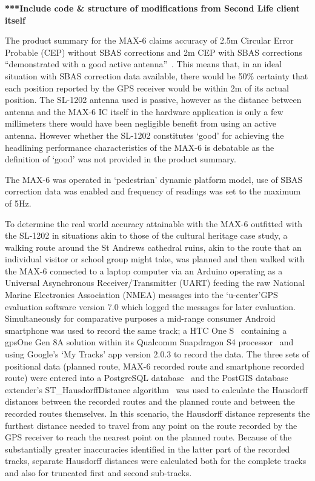\textbf{***Include code \& structure of modifications from Second Life client itself}



The product summary for the MAX-6 claims accuracy of 2.5m Circular Error Probable (CEP) without SBAS corrections and 2m CEP with SBAS corrections ``demonstrated with a good active antenna''~\cite{U-bloxAG2012}. This means that, in an ideal situation with SBAS correction data available, there would be 50\% certainty that each position reported by the GPS receiver would be within 2m of its actual position. The SL-1202 antenna used is passive, however as the distance between antenna and the MAX-6 IC itself in the hardware application is only a few millimeters there would have been negligible benefit from using an active antenna. However whether the SL-1202 constitutes `good' for achieving the headlining performance characteristics of the MAX-6 is debatable as the definition of `good' was not provided in the product summary.

The MAX-6 was operated in `pedestrian' dynamic platform model, use of SBAS correction data was enabled and frequency of readings was set to the maximum of 5Hz.

To determine the real world accuracy attainable with the MAX-6 outfitted with the SL-1202 in situations akin to those of the cultural heritage case study, a walking route around the St Andrews cathedral ruins, akin to the route that an individual visitor or school group might take, was planned and then walked with the MAX-6 connected to a laptop computer via an Arduino operating as a Universal Asynchronous Receiver/Transmitter (UART) feeding the raw National Marine Electronics Association (NMEA) messages into the `u-center'GPS evaluation software version 7.0 which logged the messages for later evaluation. Simultaneously for comparative purposes a mid-range consumer Android smartphone was used to record the same track; a HTC One S~\cite{HTCCorporation2013} containing a gpsOne Gen 8A solution within its Qualcomm Snapdragon S4 processor~\cite{QualcommIncorporated2013} and using Google's `My Tracks' app version 2.0.3 to record the data. The three sets of positional data (planned route, MAX-6 recorded route and smartphone recorded route) were entered into a PostgreSQL database~\cite{Daviesc,Daviesb} and the PostGIS database extender's ST\_HausdorffDistance algorithm~\cite{PostGIS} was used to calculate the Hausdorff distances between the recorded routes and the planned route and between the recorded routes themselves. In this scenario, the Hausdorff distance represents the furthest distance needed to travel from any point on the route recorded by the GPS receiver to reach the nearest point on the planned route. Because of the substantially greater inaccuracies identified in the latter part of the recorded tracks, separate Hausdorff distances were calculated both for the complete tracks and also for truncated first and second sub-tracks.

